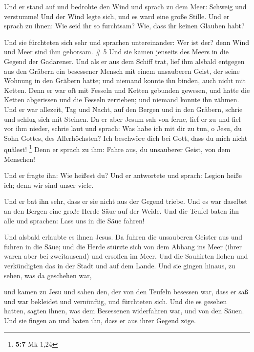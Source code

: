  Und er stand auf und bedrohte den Wind und sprach zu dem
Meer: Schweig und verstumme! Und der Wind legte sich, und es ward eine
große Stille.  Und er sprach zu ihnen: Wie seid ihr so
furchtsam? Wie, dass ihr keinen Glauben habt?

 Und sie fürchteten sich sehr und sprachen untereinander:
Wer ist der? denn Wind und Meer sind ihm gehorsam. \# 5 
Und sie kamen jenseits des Meers in die Gegend der Gadarener.
 Und als er aus dem Schiff trat, lief ihm alsbald entgegen
aus den Gräbern ein besessener Mensch mit einem unsauberen Geist,
 der seine Wohnung in den Gräbern hatte; und niemand
konnte ihn binden, auch nicht mit Ketten.  Denn er war oft
mit Fesseln und Ketten gebunden gewesen, und hatte die Ketten abgerissen
und die Fesseln zerrieben; und niemand konnte ihn zähmen. 
Und er war allezeit, Tag und Nacht, auf den Bergen und in den Gräbern,
schrie und schlug sich mit Steinen.  Da er aber Jesum sah
von ferne, lief er zu und fiel vor ihm nieder, schrie laut und sprach:
 Was habe ich mit dir zu tun, o Jesu, du Sohn Gottes, des
Allerhöchsten? Ich beschwöre dich bei Gott, dass du mich nicht quälest!
\footnote{\textbf{5:7} Mk 1,24}  Denn er sprach zu ihm:
Fahre aus, du unsauberer Geist, von dem Menschen!

 Und er fragte ihn: Wie heißest du? Und er antwortete und
sprach: Legion heiße ich; denn wir sind unser viele.

 Und er bat ihn sehr, dass er sie nicht aus der Gegend
triebe.  Und es war daselbst an den Bergen eine große
Herde Säue auf der Weide.  Und die Teufel baten ihn alle
und sprachen: Lass uns in die Säue fahren!

 Und alsbald erlaubte es ihnen Jesus. Da fuhren die
unsauberen Geister aus und fuhren in die Säue; und die Herde stürzte
sich von dem Abhang ins Meer (ihrer waren aber bei zweitausend) und
ersoffen im Meer.  Und die Sauhirten flohen und
verkündigten das in der Stadt und auf dem Lande. Und sie gingen hinaus,
zu sehen, was da geschehen war,

 und kamen zu Jesu und sahen den, der von den Teufeln
besessen war, dass er saß und war bekleidet und vernünftig, und
fürchteten sich.  Und die es gesehen hatten, sagten
ihnen, was dem Besessenen widerfahren war, und von den Säuen.
 Und sie fingen an und baten ihn, dass er aus ihrer
Gegend zöge.

